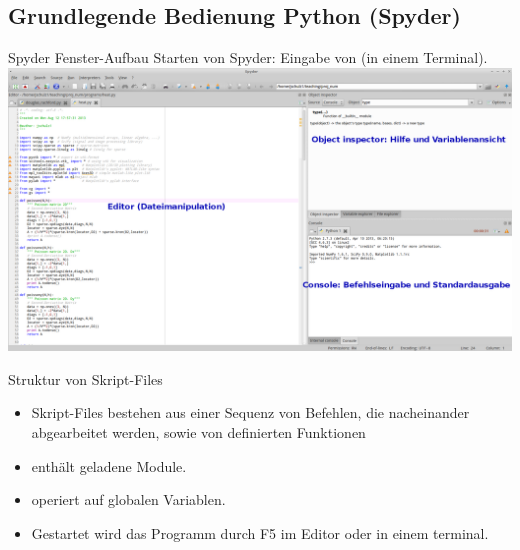 \documentclass[hyperref={xetex}]{beamer}
\begin{document}
\subsection{Grundlegende Bedienung Python (Spyder)}


\begin{frame}[fragile]{Spyder Fenster-Aufbau}
Starten von Spyder: Eingabe von  (in einem Terminal).
\centering\includegraphics[width=1\textwidth]{figures/Screenshot_spyder}

\end{frame}

\begin{frame}[fragile]{Struktur von Skript-Files}
\begin{itemize}
\item Skript-Files bestehen aus einer Sequenz von Befehlen, die
  nacheinander abgearbeitet werden, sowie von definierten Funktionen
\item enthält geladene Module.
\item operiert auf globalen Variablen.

\item Gestartet wird das Programm  durch F5 im Editor oder in einem terminal.

\end{itemize}
\end{frame}
\end{document}
